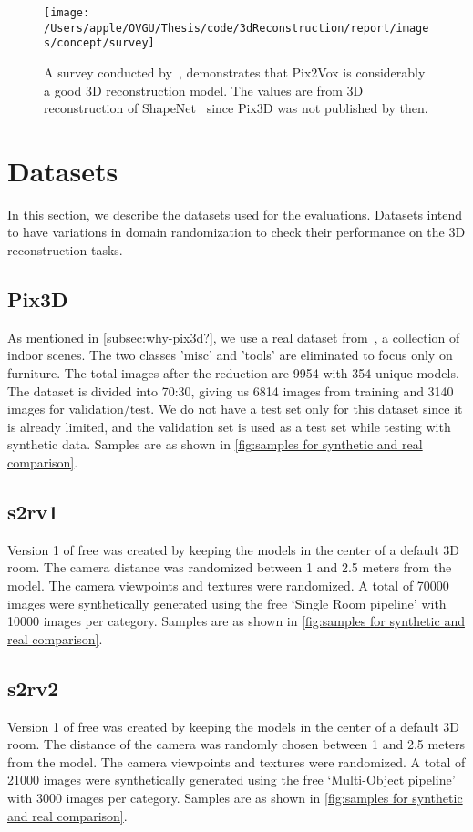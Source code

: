 \begin{figure}[ht]
    \centering
    \texttt{[image: /Users/apple/OVGU/Thesis/code/3dReconstruction/report/images/concept/survey]}
    \caption[Survey Results for 3D-Reconstruction.]{A survey conducted by~\cite{Han2021ImageBased3O}, demonstrates that Pix2Vox is considerably a good 3D reconstruction model.
    The values are from 3D reconstruction of ShapeNet~\cite{shapenet2015} since Pix3D was not published by then.}
    \label{fig:survey on 3d reconstruction}
\end{figure}


\section{Datasets}\label{sec:datasets}
In this section, we describe the datasets used for the evaluations.
Datasets intend to have variations in domain randomization to check their performance on the 3D reconstruction tasks.

\subsection{Pix3D}\label{subsec:pix3d}
As mentioned in \autoref{subsec:why-pix3d?}, we use a real dataset from~\cite{Sun2018}, a collection of indoor scenes.
The two classes ’misc’ and ’tools’ are eliminated to focus only on furniture.
The total images after the reduction are 9954 with 354 unique models.
The dataset is divided into 70:30, giving us 6814 images from training and 3140 images for validation/test.
We do not have a test set only for this dataset since it is already limited, and the validation set is used as a test set while testing with synthetic data.
Samples are as shown in \autoref{fig:samples for synthetic and real comparison}.

\subsection{\gls{s2rv1}}\label{subsec:gls{free}-version-1}
Version 1 of \gls{free} was created by keeping the models in the center of a default 3D room.
The camera distance was randomized between 1 and 2.5 meters from the model.
The camera viewpoints and textures were randomized.
A total of 70000 images were synthetically generated using the \gls{free} `Single Room pipeline' with 10000 images per category.
Samples are as shown in \autoref{fig:samples for synthetic and real comparison}.

\subsection{\gls{s2rv2}}\label{subsec:gls{free}-version-2}
Version 1 of \gls{free} was created by keeping the models in the center of a default 3D room.
The distance of the camera was randomly chosen between 1 and 2.5 meters from the model.
The camera viewpoints and textures were randomized.
A total of 21000 images were synthetically generated using the \gls{free} `Multi-Object pipeline' with 3000 images per category.
Samples are as shown in \autoref{fig:samples for synthetic and real comparison}.

